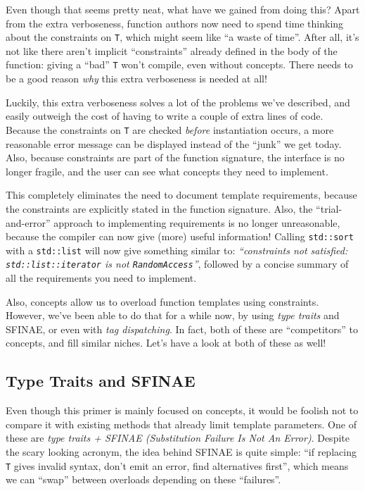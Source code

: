     \noindent Even though that seems pretty neat, what have we gained from doing this? Apart from the extra verboseness, function authors now need to spend  time thinking about the constraints on \texttt{T}, which might seem like ``a waste of time''. After all, it's not like there aren't implicit ``constraints'' already defined in the body of the function: giving a ``bad'' \texttt{T} won't compile, even without concepts. There needs to be a good reason \emph{why} this extra verboseness is needed at all!

    Luckily, this extra verboseness solves a lot of the problems we've described, and easily outweigh the cost of having to write a couple of extra lines of code. Because the constraints on \texttt{T} are checked \emph{before} instantiation occurs, a more reasonable error message can be displayed instead of the ``junk'' we get today. Also, because constraints are part of the function signature, the interface is no longer fragile, and the user can see what concepts they need to implement.

    This completely eliminates the need to document template requirements, because the constraints are explicitly stated in the function signature. Also, the ``trial-and-error'' approach to implementing requirements is no longer unreasonable, because the compiler can now give (more) useful information! Calling \texttt{std::sort} with a \texttt{std::list} will now give something similar to: \emph{``constraints not satisfied: \texttt{std::list::iterator} is not \texttt{RandomAccess}''}, followed by a concise summary of all the requirements you need to implement.

    Also, concepts allow us to overload function templates using constraints. However, we've been able to do that for a while now, by using \emph{type traits} and SFINAE, or even with \emph{tag dispatching}. In fact, both of these are ``competitors'' to concepts, and fill similar niches. Let's have a look at both of these as well!

\subsection{Type Traits and SFINAE} \label{sec:type_traits_and_sfinae}

    Even though this primer is mainly focused on concepts, it would be foolish not to compare it with existing methods that already limit template parameters. One of these are \emph{type traits + SFINAE (Substitution Failure Is Not An Error)}. Despite the scary looking acronym, the idea behind SFINAE is quite simple: ``if replacing \texttt{T} gives invalid syntax, don't emit an error, find alternatives first'', which means we can ``swap'' between overloads depending on these ``failures''.

